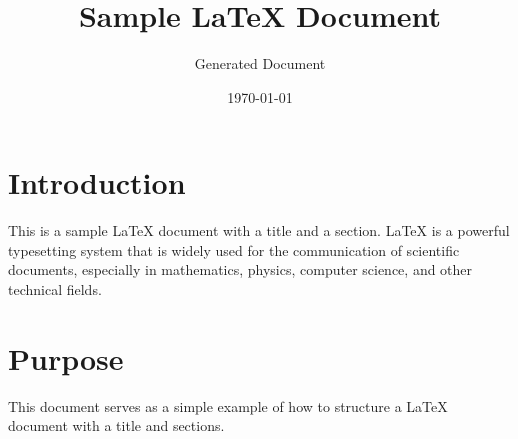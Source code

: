 \documentclass{article}
\title{Sample LaTeX Document}
\author{Generated Document}
\date{\today}
\begin{document}
\maketitle

\section{Introduction}
This is a sample LaTeX document with a title and a section. LaTeX is a powerful typesetting system that is widely used for the communication of scientific documents, especially in mathematics, physics, computer science, and other technical fields.

\section{Purpose}
This document serves as a simple example of how to structure a LaTeX document with a title and sections.
\end{document}
